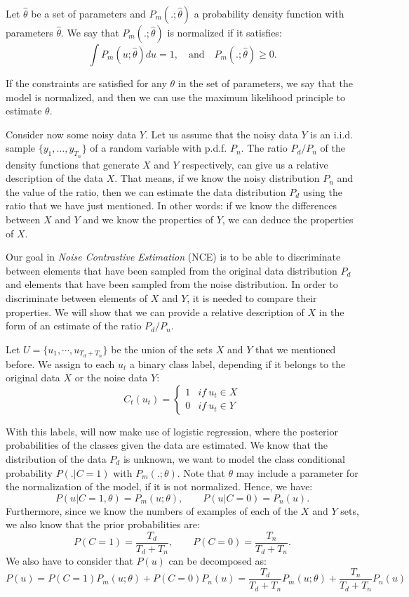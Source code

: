 \begin{ndef}
Let $\hat{\theta}$ be a set of parameters and $P_m(.;\hat{\theta})$ a probability density function with parameters $\hat{\theta}$. We say that $P_m(.;\hat{\theta})$ is normalized if it satisfies:
$$
\int P_m(u;\hat{\theta})du = 1, \quad \text{and}\quad P_m(.;\hat{\theta})\geq 0.
$$
\end{ndef}

If the constraints are satisfied for any $\theta$ in the set of parameters, we say that the model is normalized, and then we can use the maximum likelihood principle to estimate $\theta$.

Consider now some noisy data $Y$. Let us assume that the noisy data $Y$ is an i.i.d. sample $\{y_1,\dots,y_{T_n}\}$ of a random variable with p.d.f. $P_n$. The ratio $P_d/P_n$ of the density functions that generate $X$ and $Y$ respectively, can give us a relative description of the data $X$. That means, if we know the noisy distribution $P_n$ and the value of the ratio, then we can estimate the data distribution $P_d$ using the ratio that we have just mentioned. In other words: if we know the differences between $X$ and $Y$ and we know the properties of $Y$, we can deduce the properties of $X$.

Our goal in \emph{Noise Contrastive Estimation} (NCE) is to be able to discriminate between elements that have been sampled from the original data distribution $P_d$ and elements that have been sampled from the noise distribution. In order to discriminate between elements of $X$ and $Y$, it is needed to compare their properties. We will show that we can provide a relative description of $X$ in the form of an estimate of the ratio $P_d/P_n$.


Let $U = \{u_1,\cdots,u_{T_d + T_n}\}$ be the union of the sets $X$ and $Y$ that we mentioned before. We assign to each $u_t$ a binary class label, depending if it belongs to the original data $X$ or the noise data $Y$:
\[
C_t(u_t) = \begin{cases}
1 & if \ u_t \in X\\
0 & if \ u_t \in Y
\end{cases}
\]

With this labels, will now make use of logistic regression, where the posterior probabilities of the classes given the data are estimated. We know that the distribution of the data $P_d$ is unknown, we want to model the class conditional probability $P(.|C=1)$ with $P_m(.;\theta)$. Note that $\theta$ may include a parameter for the normalization of the model, if it is not normalized. Hence, we have:
\[
P(u|C = 1,\theta) = P_m(u;\theta), \quad \quad P(u|C = 0) = P_n(u).
\]
Furthermore, since we know the numbers of examples of each of the $X$ and $Y$ sets, we also know that the prior probabilities are:
\[
P(C = 1) = \frac{T_d}{T_d + T_n}, \quad \quad P(C = 0) = \frac{T_n}{T_d + T_n}.
\]
We also have to consider that $P(u)$ can be decomposed as:
\[
P(u) = P(C = 1) P_m(u; \theta) + P(C = 0)P_n(u) = \frac{T_d}{T_d + T_n} P_m(u;\theta) + \frac{T_n}{T_d + T_n}P_n(u)   
\]

